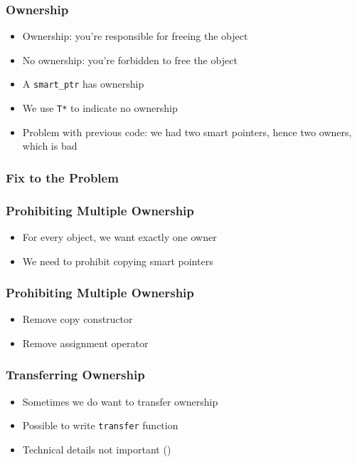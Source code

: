 \documentclass{../ucll-slides}
\begin{document}
\begin{frame}
  \frametitle{Ownership}
  \begin{itemize}
    \item Ownership: you're responsible for freeing the object
    \item No ownership: you're forbidden to free the object
    \item A {\tt smart\_ptr} has ownership
    \item We use {\tt T*} to indicate no ownership
    \item Problem with previous code: we had two smart pointers, hence two owners, which is bad
  \end{itemize}
\end{frame}

\begin{frame}
  \frametitle{Fix to the Problem}
\end{frame}

\begin{frame}
  \frametitle{Prohibiting Multiple Ownership}
  \begin{itemize}
    \item For every object, we want exactly one owner
    \item We need to prohibit copying smart pointers
  \end{itemize}
\end{frame}

\begin{frame}
  \frametitle{Prohibiting Multiple Ownership}
  \begin{itemize}
    \item Remove copy constructor
    \item Remove assignment operator
  \end{itemize}
\end{frame}

\begin{frame}
  \frametitle{Transferring Ownership}
  \begin{itemize}
    \item Sometimes we do want to transfer ownership
    \item Possible to write {\tt transfer} function
    \item Technical details not important ()
  \end{itemize}
\end{frame}
\end{document}
